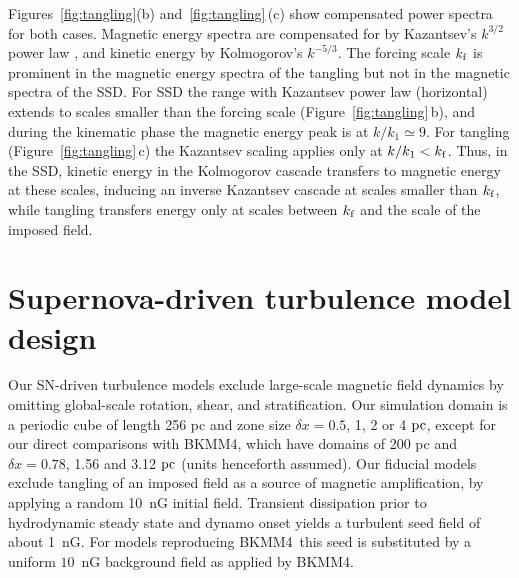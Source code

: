 \documentclass[preprint2]{aastex63}
\newcommand\kf{k_{\rm f} }
\newcommand\pc{~ {\rm pc}}
\newcommand\dx{ {\delta x}}
\newcommand\BKM{{\sf BKMM4}}
\newcommand{\fg}[1]{\textcolor{mypurple}{#1}}
\begin{document}
 {Figures~\ref{fig:tangling}(b) and~\ref{fig:tangling}\,(c) show
 compensated power spectra for both cases.}
 Magnetic energy spectra are compensated {for by} Kazantsev's $k^{3/2}$
 {power law} \citep{Sch02,BS14}, and kinetic energy {by} Kolmogorov's
 $k^{-5/3}$.
 The forcing scale $\kf$ is {prominent} in
 the magnetic energy {spectra of the tangling} but
 {not} {in the magnetic spectra of the SSD}.
 {For SSD the range with Kazantsev power law (horizontal) extends to scales
 smaller than the forcing scale (Figure~\ref{fig:tangling}\,b), and during the
 kinematic phase the magnetic energy peak is at $k/k_1\simeq9$.}
 {For tangling (Figure~\ref{fig:tangling}\,c) the Kazantsev
 {scaling} applies only at $k/k_1<\kf$.} 
 Thus, in the SSD, kinetic energy {in the Kolmogorov cascade} transfers to
 {magnetic energy} 
 at these scales, inducing an inverse Kazantsev {cascade}
 at scales {smaller than} $\kf$, while tangling transfers energy only at
 scales between $\kf$ and the scale of the imposed field.
 
\section{{Supernova-driven} turbulence model design} \label{sec:model}

 {Our} SN-driven turbulence models exclude large-scale magnetic field
 dynamics by {omitting global-scale} rotation, shear, and stratification.
 Our simulation domain is a periodic cube of length 256 pc and zone size
 $\dx=0.5$, 1, 2 or 4$\pc${, except for {our} direct comparisons with
 \BKM, { which have} domains {of} 200 pc and $\dx=0.78$, 1.56 and
 3.12$\pc$ (units henceforth assumed)}.
 \fg{Our fiducial models exclude tangling of an imposed field as a source
 of magnetic amplification, by applying a random 10~nG initial field.
 Transient dissipation
     prior to hydrodynamic steady state and dynamo onset yields
a turbulent seed field of about 1~nG.
 For models reproducing \BKM\ this seed is substituted by
 a uniform $10$~nG background field as applied by \BKM.}
\end{document}
